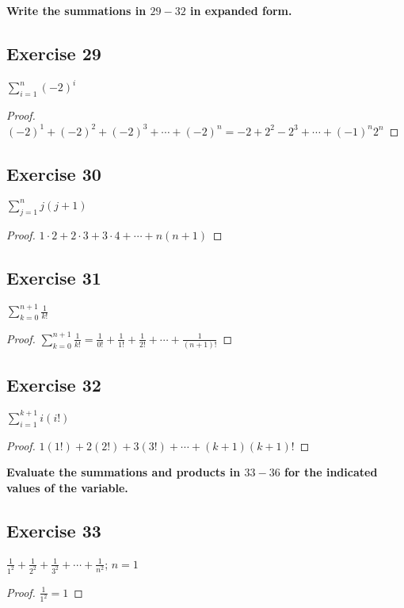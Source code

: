\documentclass[14pt]{extarticle}
\newcommand{\dps}{\displaystyle}
\newcommand{\cy}{\color{cyan}}
\begin{document}
{\bf\cy Write the summations in $29-32$ in expanded form.}

\subsection{Exercise 29}
$\dps\sum_{i=1}^{n}(-2)^i$

\begin{proof}
    $(-2)^1 + (-2)^2 + (-2)^3 + \cdots + (-2)^n = -2 + 2^2 - 2^3 + \cdots + (-1)^n2^n$
\end{proof}

\subsection{Exercise 30}
$\dps\sum_{j=1}^{n}j(j+1)$

\begin{proof}
    $1\cdot2 + 2\cdot3 + 3\cdot4 + \cdots + n(n+1)$
\end{proof}

\subsection{Exercise 31}
$\dps\sum_{k=0}^{n+1}\frac{1}{k!}$

\begin{proof}
    $\dps\sum_{k=0}^{n+1}\frac{1}{k!} = \frac{1}{0!} + \frac{1}{1!} + \frac{1}{2!} + \cdots + \frac{1}{(n+1)!}$
\end{proof}

\subsection{Exercise 32}
$\dps\sum_{i=1}^{k+1}i(i!)$

\begin{proof}
    $1(1!) + 2(2!) + 3(3!) + \cdots + (k+1)(k+1)!$
\end{proof}

{\bf\cy Evaluate the summations and products in $33-36$ for the indicated values of the variable.}

\subsection{Exercise 33}
$\dps \frac{1}{1^2} + \frac{1}{2^2} + \frac{1}{3^2} + \cdots + \frac{1}{n^2}$; $n = 1$

\begin{proof}
    $\dps\frac{1}{1^2} = 1$
\end{proof}
\end{document}
